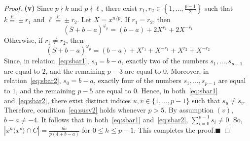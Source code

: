 \documentclass[10pt,a4paper]{amsart}
\begin{document}
\begin{proof}
\indent\textbf{(v)} Since $p\nmid k$ and $p\nmid \ell$, there exist $r_1,r_2\in\left\{1,\ldots,\frac{p-1}{2}\right\}$ such that $k\stackrel{p}{\equiv}\pm r_1$ and $\ell\stackrel{p}{\equiv}\pm r_2$. Let $X=x^{n/p}$. If $r_1=r_2$, then
\begin{equation}\label{eq:sbar1}
(\overline{S}+b-a)^{\varphi_p}=(b-a)+2X^{r_1}+2X^{-r_1}	
\end{equation}
Otherwise, if $r_1\neq r_2$, then
\begin{equation}\label{eq:sbar2}
(\overline{S}+b-a)^{\varphi_p}=(b-a)+X^{r_1}+X^{-r_1}+X^{r_2}+X^{-r_2}	
\end{equation}	
Since, in relation~\eqref{eq:sbar1}, \(s_0=b-a\), exactly two of the numbers
\(s_1,\ldots,s_{p-1}\) are equal to \(2\), and the remaining
\(p-3\) are equal to \(0\). Moreover, in relation~\eqref{eq:sbar2},
\(s_0=b-a\), exactly four of the numbers
\(s_1,\ldots,s_{p-1}\) are equal to \(1\), and the remaining
\(p-5\) are equal to \(0\). Hence, in both~\eqref{eq:sbar1} and~\eqref{eq:sbar2},
there exist distinct indices \(u,v\in\{1,\ldots,p-1\}\) such that
\(s_u\neq s_v\). Therefore, condition~\eqref{eq:susv2} holds whenever \(p>5\). By assumption \((v)\), \(b-a\neq -4\). It follows that in both~\eqref{eq:sbar1} and~\eqref{eq:sbar2}, \(\sum_{i=0}^{p-1}s_i\neq 0\). So, $
\left|x^h\langle x^p\rangle\cap C\right|
=
\frac{bn}{p(4+b-a)}$ for $0\le h\le p-1$. This completes the proof.\hfill$\blacksquare$



	\end{proof}	
\end{document}
